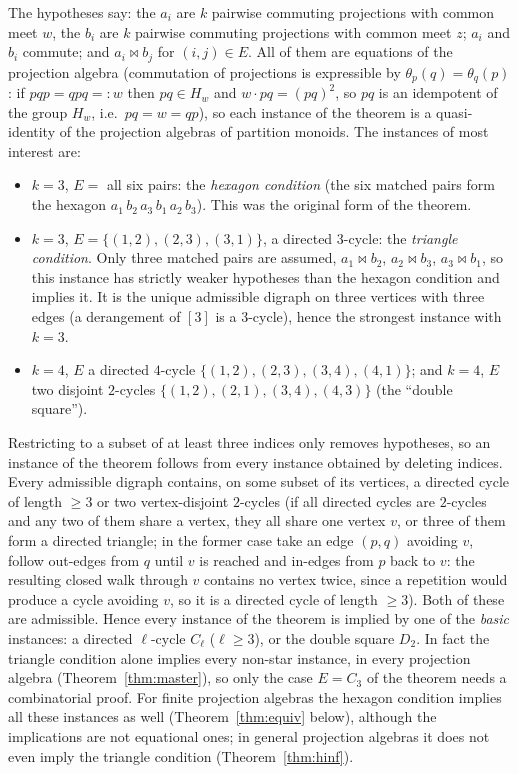\documentclass[11pt]{amsart}
\theoremstyle{definition}
\newcommand{\mt}{\bowtie}   %
\begin{document}
The hypotheses say: the $a_i$ are $k$ pairwise commuting projections with common meet $w$, the $b_i$ are $k$ pairwise commuting projections with common meet $z$; $a_i$ and $b_i$ commute; and $a_i\mt b_j$ for $(i,j)\in E$. All of them are equations of the projection algebra (commutation of projections is expressible by $\theta_p(q)=\theta_q(p)$: if $pqp=qpq=:w$ then $pq\in H_w$ and $w\cdot pq=(pq)^2$, so $pq$ is an idempotent of the group $H_w$, i.e.\ $pq=w=qp$), so each instance of the theorem is a quasi-identity of the projection algebras of partition monoids. The instances of most interest are:
\begin{itemize}[nosep]
\item $k=3$, $E=$ all six pairs: the \emph{hexagon condition} (the six matched pairs form the hexagon $a_1\,b_2\,a_3\,b_1\,a_2\,b_3$). This was the original form of the theorem.
\item $k=3$, $E=\{(1,2),(2,3),(3,1)\}$, a directed $3$-cycle: the \emph{triangle condition}. Only three matched pairs are assumed, $a_1\mt b_2$, $a_2\mt b_3$, $a_3\mt b_1$, so this instance has strictly weaker hypotheses than the hexagon condition and implies it. It is the unique admissible digraph on three vertices with three edges (a derangement of $[3]$ is a $3$-cycle), hence the strongest instance with $k=3$.
\item $k=4$, $E$ a directed $4$-cycle $\{(1,2),(2,3),(3,4),(4,1)\}$; and $k=4$, $E$ two disjoint $2$-cycles $\{(1,2),(2,1),(3,4),(4,3)\}$ (the ``double square'').
\end{itemize}
Restricting to a subset of at least three indices only removes hypotheses, so an instance of the theorem follows from every instance obtained by deleting indices. Every admissible digraph contains, on some subset of its vertices, a directed cycle of length $\ge3$ or two vertex-disjoint $2$-cycles (if all directed cycles are $2$-cycles and any two of them share a vertex, they all share one vertex $v$, or three of them form a directed triangle; in the former case take an edge $(p,q)$ avoiding $v$, follow out-edges from $q$ until $v$ is reached and in-edges from $p$ back to $v$: the resulting closed walk through $v$ contains no vertex twice, since a repetition would produce a cycle avoiding $v$, so it is a directed cycle of length $\ge3$). Both of these are admissible. Hence every instance of the theorem is implied by one of the \emph{basic} instances: a directed $\ell$-cycle $C_\ell$ ($\ell\ge3$), or the double square $D_2$. In fact the triangle condition alone implies every non-star instance, in every projection algebra (Theorem~\ref{thm:master}), so only the case $E=C_3$ of the theorem needs a combinatorial proof. For finite projection algebras the hexagon condition implies all these instances as well (Theorem~\ref{thm:equiv} below), although the implications are not equational ones; in general projection algebras it does not even imply the triangle condition (Theorem~\ref{thm:hinf}).
\end{document}
